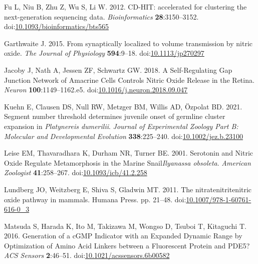 \documentclass[
  10pt,
  onecolumn]{article}
\newlength{\cslhangindent}
\newlength{\cslentryspacingunit} %
\newenvironment{CSLReferences}[2] %
 {%
  \setlength{\parindent}{0pt}
  \ifodd #1
  \let\oldpar\par
  \def\par{\hangindent=\cslhangindent\oldpar}
  \fi
  \setlength{\parskip}{#2\cslentryspacingunit}
 }%
 {}
\begin{document}
\begin{CSLReferences}{1}{0}
\leavevmode{}%
Fu L, Niu B, Zhu Z, Wu S, Li W. 2012. CD-HIT: accelerated for clustering
the next-generation sequencing data. \emph{Bioinformatics}
\textbf{28}:3150--3152.
doi:\href{https://doi.org/10.1093/bioinformatics/bts565}{10.1093/bioinformatics/bts565}

\leavevmode{}%
Garthwaite J. 2015. From synaptically localized to volume transmission
by nitric oxide. \emph{The Journal of Physiology} \textbf{594}:9--18.
doi:\href{https://doi.org/10.1113/jp270297}{10.1113/jp270297}

\leavevmode{}%
Jacoby J, Nath A, Jessen ZF, Schwartz GW. 2018. A Self-Regulating Gap
Junction Network of Amacrine Cells Controls Nitric Oxide Release in the
Retina. \emph{Neuron} \textbf{100}:1149--1162.e5.
doi:\href{https://doi.org/10.1016/j.neuron.2018.09.047}{10.1016/j.neuron.2018.09.047}

\leavevmode{}%
Kuehn E, Clausen DS, Null RW, Metzger BM, Willis AD, Özpolat BD. 2021.
Segment number threshold determines juvenile onset of germline cluster
expansion in {\emph{Platynereis dumerilii}}. \emph{Journal of
Experimental Zoology Part B: Molecular and Developmental Evolution}
\textbf{338}:225--240.
doi:\href{https://doi.org/10.1002/jez.b.23100}{10.1002/jez.b.23100}

\leavevmode{}%
Leise EM, Thavaradhara K, Durham NR, Turner BE. 2001. Serotonin and
Nitric Oxide Regulate Metamorphosis in the Marine Snail{\emph{Ilyanassa
obsoleta}}. \emph{American Zoologist} \textbf{41}:258--267.
doi:\href{https://doi.org/10.1093/icb/41.2.258}{10.1093/icb/41.2.258}

\leavevmode{}%
Lundberg JO, Weitzberg E, Shiva S, Gladwin MT. 2011. The
nitrate{\textendash}nitrite{\textendash}nitric oxide pathway in mammals.
Humana Press. pp. 21--48.
doi:\href{https://doi.org/10.1007/978-1-60761-616-0_3}{10.1007/978-1-60761-616-0\_3}

\leavevmode{}%
Matsuda S, Harada K, Ito M, Takizawa M, Wongso D, Tsuboi T, Kitaguchi T.
2016. Generation of a cGMP Indicator with an Expanded Dynamic Range by
Optimization of Amino Acid Linkers between a Fluorescent Protein and
PDE5? \emph{ACS Sensors} \textbf{2}:46--51.
doi:\href{https://doi.org/10.1021/acssensors.6b00582}{10.1021/acssensors.6b00582}


\end{CSLReferences}
\end{document}
